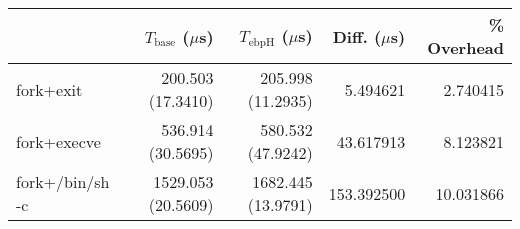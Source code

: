 \begin{tabular}{>{\ttfamily}lrrrr}
\toprule
\multicolumn{1}{l}{Process} & $T_\text{base}$ ($\mu$s) & $T_\text{ebpH}$ ($\mu$s) &  Diff. ($\mu$s) &  \% Overhead \\
\midrule
                  fork+exit &        200.503 (17.3410) &        205.998 (11.2935) &        5.494621 &     2.740415 \\
                fork+execve &        536.914 (30.5695) &        580.532 (47.9242) &       43.617913 &     8.123821 \\
            fork+/bin/sh -c &       1529.053 (20.5609) &       1682.445 (13.9791) &      153.392500 &    10.031866 \\
\bottomrule
\end{tabular}
